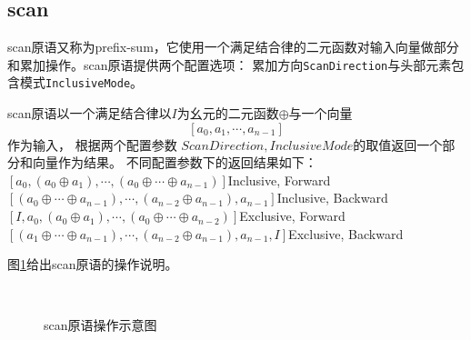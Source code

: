 \subsection{scan}
scan原语又称为prefix-sum，它使用一个满足结合律的二元函数对输入向量做部分和累加操作。scan原语提供两个配置选项：
累加方向\texttt{ScanDirection}与头部元素包含模式\texttt{InclusiveMode}。
\begin{definition}
  scan原语以一个满足结合律以$I$为幺元的二元函数$\oplus$与一个向量$$[a_0, a_1, \cdots, a_{n-1}]$$作为输入，
  根据两个配置参数  $ScanDirection, InclusiveMode$的取值返回一个部分和向量作为结果。
  不同配置参数下的返回结果如下：\\
  $[a_0, (a_0\oplus{}a_1), \cdots, (a_0\oplus{}\cdots\oplus{}a_{n-1})]$\hfill{}Inclusive, Forward\\
  $[(a_0\oplus\cdots\oplus{}a_{n-1}), \cdots, (a_{n-2}\oplus{}a_{n-1}), a_{n-1}]$\hfill{}Inclusive, Backward\\
  $[I, a_0, (a_0\oplus{}a_1), \cdots, (a_0\oplus{}\cdots\oplus{}a_{n-2})]$\hfill{}Exclusive, Forward\\
  $[(a_1\oplus\cdots\oplus{}a_{n-1}), \cdots, (a_{n-2}\oplus{}a_{n-1}), a_{n-1}, I]$\hfill{}Exclusive, Backward\\
\end{definition}

图\ref{fig:scan-diagram}给出scan原语的操作说明。
\begin{figure}[h]
  \centering
  \\
  \caption{scan原语操作示意图}
  \label{fig:scan-diagram}
\end{figure}

